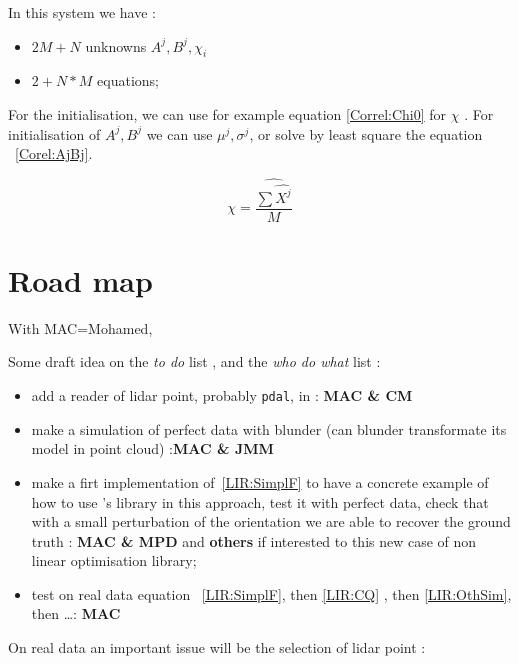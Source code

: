 In this system we have :

\begin{itemize}
	\item $2 M + N$ unknowns  $A^j,B^j,\chi _i$
   \item $2 + N*M$ equations;		 
\end{itemize}


For the initialisation, we can use for example equation  \ref{Correl:Chi0} for  $\chi$ .
For initialisation of $A^j, B^j$ we can use $\mu^j,\sigma^j$, or solve by least square the
equation ~\ref{Corel:AjBj}.

\begin{equation}
	\chi = \widehat {\frac{\sum \widehat {X^j} }{M}} \label{Correl:Chi0}
\end{equation}



\section{Road map}

With MAC=Mohamed,

Some draft idea on the \emph{to do} list , and the  \emph{who do what} list :

\begin{itemize}
    \item  add a reader of lidar point, probably {\tt pdal}, in \PPP  :  {\bf MAC \& CM}

    \item  make a simulation of perfect data with blunder  (can blunder transformate its model in point cloud) :{\bf MAC \& JMM}

    \item make a firt implementation of~\ref{LIR:SimplF} to have a concrete example of 
         how to use  \PPP's library in this approach, test it with perfect data, check that  with
         a small perturbation of the orientation we are able to recover the ground truth :
         {\bf  MAC \& MPD} and {\bf  others} if interested to this new case of non linear optimisation library;

    \item test on real data equation ~\ref{LIR:SimplF}, then \ref{LIR:CQ} , then \ref{LIR:OthSim}, then \dots  : {\bf MAC} 
\end{itemize}

On real data an important issue will be  the selection of lidar point  : 

